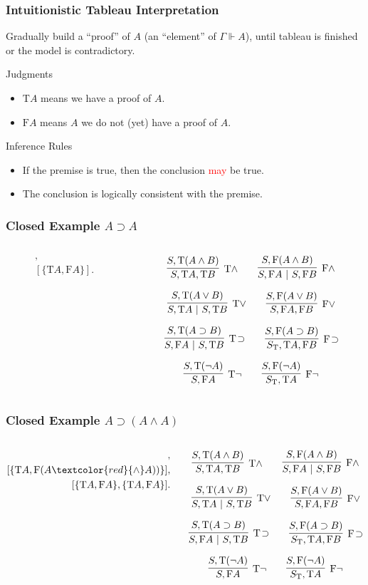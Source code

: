 \documentclass[mathserif]{beamer}
\def\|{~|~}
\def\T{\textrm{T}}
\def\F{\textrm{F}}
\def\imp{\supset}
\newcommand{\diff}[1]{\textcolor{red}{#1}}
\newcommand{\force}[1]{\Gamma \Vdash #1}
\def\mycalc{
$$
\infer
  [\T \land]
  {S , \T A , \T B}
{
  {S , \T(A \land B)}
}
\qquad
\infer
  [\F \land]
  {S, \F A \| S, \F B}
{
  {S, \F(A \land B)}
}
$$

$$
\infer
  [\T \lor]
  {S , \T A \| S , \T B}
{
  {S , \T(A \lor B)}
}
\qquad
\infer
  [\F \lor]
  {S, \F A , \F B}
{
  {S, \F(A \lor B)}
}
$$

$$
\infer
  [\T \! \imp]
  {S , \F A \| S , \T B}
{
  {S , \T(A \imp B)}
}
\qquad
\infer
  [\F \! \imp]
  {S_{\T}, \T A , \F B}
{
  {S, \F(A \imp B)}
}
$$

$$
\infer
  [\T \neg]
  {S , \F A}
{
  {S , \T(\neg A)}
}
\qquad
\infer
  [\F \neg]
  {S_{\T}, \T A}
{
  {S, \F(\neg A)}
}
$$
}
\begin{document}
\begin{frame}
\frametitle{Intuitionistic Tableau Interpretation}

Gradually build a ``proof'' of $A$ (an ``element'' of $\force{A}$),
until tableau is finished or the model is contradictory.

\begin{block}{Judgments}
\begin{itemize}
\item $\T A$ means we have a proof of $A$.
\item $\F A$ means $A$ we do not (yet) have a proof of $A$.
\end{itemize}
\end{block}

\begin{block}{Inference Rules}
\begin{itemize}
\item If the premise is true, then the conclusion \diff{may} be true.
\item The conclusion is logically consistent with the premise.
\end{itemize}
\end{block}

\end{frame}


\begin{frame}
\frametitle{Closed Example $A \imp A$}

\begin{columns}[T]
\begin{column}[T]{4cm}
\begin{align*}
[\{ \F(A \diff{\imp} A) \}],\\
[\{ \T A, \F A \}].
\end{align*}
\end{column}

\begin{column}[T]{7cm}
\mycalc
\end{column}
\end{columns}

\end{frame}

\begin{frame}
\frametitle{Closed Example $A \imp (A \land A)$}

\begin{columns}[T]
\begin{column}[T]{4cm}
\begin{align*}
[\{ \F(A \diff{\imp} (A \land A)) \}],\\
[\{ \T A, \F(A \diff{\land} A)) \}],\\
[\{ \T A, \F A \}, \{ \T A, \F A \}].
\end{align*}
\end{column}

\begin{column}[T]{7cm}
\mycalc
\end{column}
\end{columns}

\end{frame}
\end{document}
